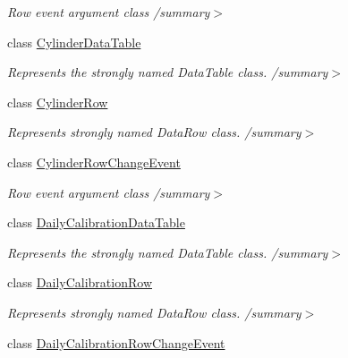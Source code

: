 \begin{DoxyCompactItemize}
\begin{DoxyCompactList}\small\item\em Row event argument class /summary$>$ \end{DoxyCompactList}\item 
class \hyperlink{class_env_int_1_1_win32_1_1_field_tech_1_1_manager_1_1_data_sets_1_1_guide_ware_mobile_data_set_1_1_cylinder_data_table}{Cylinder\+Data\+Table}
\begin{DoxyCompactList}\small\item\em Represents the strongly named Data\+Table class. /summary$>$ \end{DoxyCompactList}\item 
class \hyperlink{class_env_int_1_1_win32_1_1_field_tech_1_1_manager_1_1_data_sets_1_1_guide_ware_mobile_data_set_1_1_cylinder_row}{Cylinder\+Row}
\begin{DoxyCompactList}\small\item\em Represents strongly named Data\+Row class. /summary$>$ \end{DoxyCompactList}\item 
class \hyperlink{class_env_int_1_1_win32_1_1_field_tech_1_1_manager_1_1_data_sets_1_1_guide_ware_mobile_data_set_1_1_cylinder_row_change_event}{Cylinder\+Row\+Change\+Event}
\begin{DoxyCompactList}\small\item\em Row event argument class /summary$>$ \end{DoxyCompactList}\item 
class \hyperlink{class_env_int_1_1_win32_1_1_field_tech_1_1_manager_1_1_data_sets_1_1_guide_ware_mobile_data_set_5b380d875f3f569d74f6183f0c2ee8d7}{Daily\+Calibration\+Data\+Table}
\begin{DoxyCompactList}\small\item\em Represents the strongly named Data\+Table class. /summary$>$ \end{DoxyCompactList}\item 
class \hyperlink{class_env_int_1_1_win32_1_1_field_tech_1_1_manager_1_1_data_sets_1_1_guide_ware_mobile_data_set_1_1_daily_calibration_row}{Daily\+Calibration\+Row}
\begin{DoxyCompactList}\small\item\em Represents strongly named Data\+Row class. /summary$>$ \end{DoxyCompactList}\item 
class \hyperlink{class_env_int_1_1_win32_1_1_field_tech_1_1_manager_1_1_data_sets_1_1_guide_ware_mobile_data_set_3eedff0336860edbfd90e1bca2652873}{Daily\+Calibration\+Row\+Change\+Event}

\end{DoxyCompactItemize}
